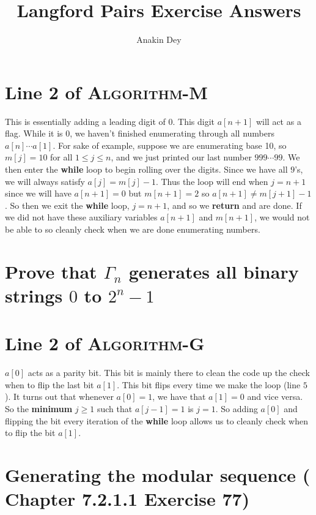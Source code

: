 \documentclass[letterpaper]{article}
\title{Langford Pairs Exercise Answers}
\author{Anakin Dey}
\begin{document}
\maketitle

\section*{Line 2 of \textsc{Algorithm-M}}

This is essentially adding a leading digit of 0. This digit $a[n + 1]$ will act as a flag. While it is $0$, we haven't finished enumerating through all numbers $a[n] \cdots a[1]$. For sake of example, suppose we are enumerating base 10, so $m[j] = 10$ for all $1 \leq j \leq n$, and we just printed our last number $999 \cdots 99$. We then enter the \textbf{while} loop to begin rolling over the digits. Since we have all $9$'s, we will always satisfy $a[j] = m[j] - 1$. Thus the loop will end when $j = n + 1$ since we will have $a[n + 1] = 0$ but $m[n + 1] = 2$ so $a[n + 1] \neq m[j + 1] - 1$. So then we exit the \textbf{while} loop, $j = n + 1$, and so we \textbf{return} and are done. If we did not have these auxiliary variables $a[n + 1]$ and $m[n + 1]$, we would not be able to so cleanly check when we are done enumerating numbers.

\section*{\boldmath Prove that $\Gamma_n$ generates all binary strings $0$ to $2^{n} - 1$}


\section*{Line 2 of \textsc{Algorithm-G}}

$a[0]$ acts as a parity bit. This bit is mainly there to clean the code up the check when to flip the last bit $a[1]$. This bit flips every time we make the loop (line $5$). It turns out that whenever $a[0] = 1$, we have that $a[1] = 0$ and vice versa. So the \textbf{minimum} $j \geq 1$ such that $a[j - 1] = 1$ is $j = 1$. So adding $a[0]$ and flipping the bit every iteration of the \textbf{while} loop allows us to cleanly check when to flip the bit $a[1]$.

\section{Generating the modular sequence (\cite{TAOCP4A} Chapter 7.2.1.1 Exercise 77)}


\printbibliography
\end{document}
